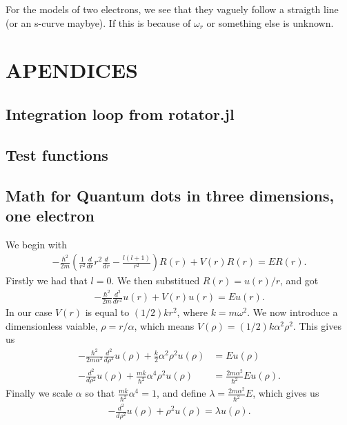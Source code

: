 \documentclass[a4paper]{article}
\begin{document}
For the models of two electrons, we see that they vaguely follow a straigth line (or an s-curve maybye). If this is because of $\omega_r$ or something else is unknown.

\section{APENDICES}
\subsection{Integration loop from rotator.jl}\label{rotator.jl}


\subsection{Test functions}\label{opp_c.jl}


\subsection{Math for Quantum dots in three dimensions, one electron}\label{opp d math}
We begin with 
\begin{align}
- \frac{\hbar^2}{2m} \left( \frac{1}{r^2} \frac{d}{dr} r^2 \frac{d}{dr} - \frac{l(l+1)}{r^2}\right) R(r) + V(r) R(r) = ER(r).
\end{align}
Firstly we had that $l=0$. We then substitued $R(r) = u(r)/r$, and got
\begin{align}
  -\frac{\hbar^2}{2 m} \frac{d^2}{dr^2} u(r) 
+ V(r)u(r)  = E u(r) .
\end{align}
In our case $V(r)$ is equal to $(1/2)kr^2$, where $k=m\omega^2$. We now introduce a dimensionless vaiable, $\rho = r/\alpha$, which means $V(\rho) = (1/2) k \alpha^2\rho^2$. This gives us
\begin{align}
-\frac{\hbar^2}{2 m \alpha^2} \frac{d^2}{d\rho^2} u(\rho) 
+ \frac{k}{2} \alpha^2\rho^2u(\rho)  &= E u(\rho) \\
 -\frac{d^2}{d\rho^2} u(\rho) 
+ \frac{mk}{\hbar^2} \alpha^4\rho^2u(\rho)  &= \frac{2m\alpha^2}{\hbar^2}E u(\rho) .
\end{align}
Finally we scale $\alpha$ so that $\frac{mk}{\hbar^2} \alpha^4 = 1$, and define $\lambda = \frac{2m\alpha^2}{\hbar^2}E$, which gives us
\begin{align}
  -\frac{d^2}{d\rho^2} u(\rho) + \rho^2u(\rho)  = \lambda u(\rho) .
\end{align}
\end{document}
